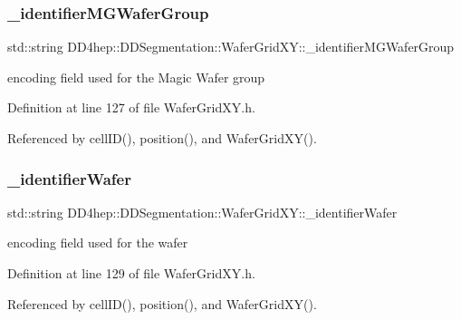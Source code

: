 \subsubsection{\texorpdfstring{\+\_\+identifier\+M\+G\+Wafer\+Group}{\_identifierMGWaferGroup}}
{\footnotesize\ttfamily std\+::string D\+D4hep\+::\+D\+D\+Segmentation\+::\+Wafer\+Grid\+X\+Y\+::\+\_\+identifier\+M\+G\+Wafer\+Group\hspace{0.3cm}{\ttfamily [protected]}}



encoding field used for the Magic Wafer group 



Definition at line 127 of file Wafer\+Grid\+X\+Y.\+h.



Referenced by cell\+I\+D(), position(), and Wafer\+Grid\+X\+Y().

\hypertarget{class_d_d4hep_1_1_d_d_segmentation_1_1_wafer_grid_x_y_aec0c4ade6e6eed2c87623f7e675b5fd1}{}\label{class_d_d4hep_1_1_d_d_segmentation_1_1_wafer_grid_x_y_aec0c4ade6e6eed2c87623f7e675b5fd1} 
\subsubsection{\texorpdfstring{\+\_\+identifier\+Wafer}{\_identifierWafer}}
{\footnotesize\ttfamily std\+::string D\+D4hep\+::\+D\+D\+Segmentation\+::\+Wafer\+Grid\+X\+Y\+::\+\_\+identifier\+Wafer\hspace{0.3cm}{\ttfamily [protected]}}



encoding field used for the wafer 



Definition at line 129 of file Wafer\+Grid\+X\+Y.\+h.



Referenced by cell\+I\+D(), position(), and Wafer\+Grid\+X\+Y().

\hypertarget{class_d_d4hep_1_1_d_d_segmentation_1_1_wafer_grid_x_y_a4cfbedf40751f8d064a0e4c071a04d66}{}\label{class_d_d4hep_1_1_d_d_segmentation_1_1_wafer_grid_x_y_a4cfbedf40751f8d064a0e4c071a04d66} 
